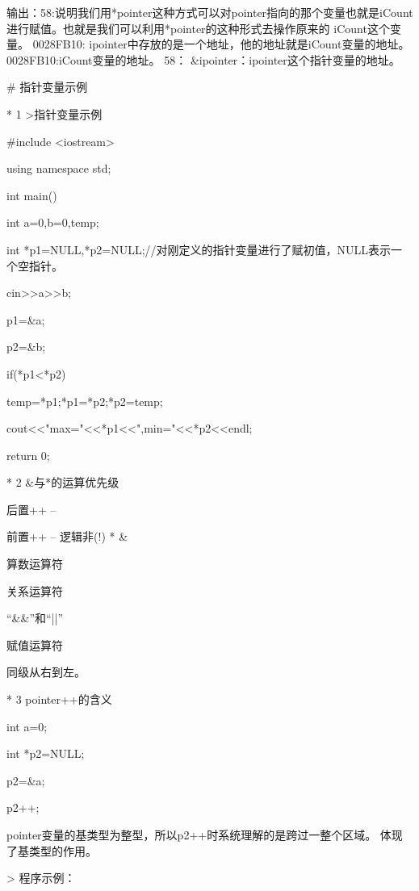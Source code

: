         输出：58:说明我们用*pointer这种方式可以对pointer指向的那个变量也就是iCount进行赋值。也就是我们可以利用*pointer的这种形式去操作原来的        iCount这个变量。
             0028FB10: ipointer中存放的是一个地址，他的地址就是iCount变量的地址。
             0028FB10:iCount变量的地址。
             58：
             &ipointer：ipointer这个指针变量的地址。

 # 指针变量示例

  * 1  >指针变量示例


       #include <iostream>

       using namespace std;

       int main()

       {

           int a=0,b=0,temp;

           int *p1=NULL,*p2=NULL;//对刚定义的指针变量进行了赋初值，NULL表示一个空指针。

           cin>>a>>b;

           p1=&a;

           p2=&b;

           if(*p1<*p2)

           {

              temp=*p1;*p1=*p2;*p2=temp;

           }

           cout<<"max="<<*p1<<",min="<<*p2<<endl;

           return 0;

       }

  * 2 &与*的运算优先级

          后置++  --

          前置++  --     逻辑非(!)   *   &

          算数运算符

          关系运算符

          “&&”和“||”

           赋值运算符

           同级从右到左。

  * 3 pointer++的含义

     int a=0;

     int *p2=NULL;

     p2=&a;

     p2++;

     pointer变量的基类型为整型，所以p2++时系统理解的是跨过一整个区域。
     体现了基类型的作用。

     > 程序示例：

